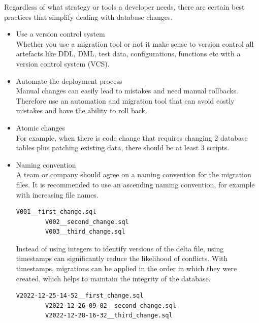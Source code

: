 Regardless of what strategy or tools a developer needs, there are certain best practices that simplify dealing with database changes.

\begin{itemize}
	\item Use a version control system\\
	Whether you use a migration tool or not it make sense to version control all artefacts like DDL, DML, test data, configurations, functions etc with a version control system (VCS).
	\item Automate the deployment process\\
	Manual changes can easily lead to mistakes and need manual rollbacks. Therefore use an automation and migration tool that can avoid costly mistakes and have the ability to roll back.
	\item Atomic changes\\
	For example, when there is code change that requires changing 2 database tables plus patching existing data, there should be at least 3 scripts.
	\item Naming convention\\
	A team or company should agree on a naming convention for the migration files. It is recommended to use an ascending naming convention, for example with increasing file names.
	\begin{lstlisting}[caption=Increasing file names]
		V001__first_change.sql
		V002__second_change.sql
		V003__third_change.sql
	\end{lstlisting}
	Instead of using integers to identify versions of the delta file, using timestamps can significantly reduce the likelihood of conflicts. With timestamps, migrations can be applied in the order in which they were created, which helps to maintain the integrity of the database. 

	\begin{lstlisting}[caption=Timestamps]
		V2022-12-25-14-52__first_change.sql
		V2022-12-26-09-02__second_change.sql
		V2022-12-28-16-32__third_change.sql
	\end{lstlisting}


\end{itemize}
